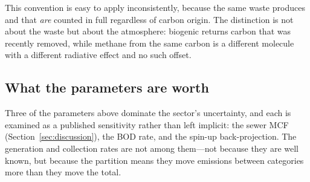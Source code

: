 This convention is easy to apply inconsistently, because the same waste produces \CHfour{} and
\NtwoO{} that \emph{are} counted in full regardless of carbon origin. The distinction is not
about the waste but about the atmosphere: biogenic \COtwo{} returns carbon that was recently
removed, while methane from the same carbon is a different molecule with a different radiative
effect and no such offset.

\subsection{What the parameters are worth}

Three of the parameters above dominate the sector's uncertainty, and each is examined as a
published sensitivity rather than left implicit: the sewer MCF (Section~\ref{sec:discussion}),
the BOD rate, and the spin-up back-projection. The generation and collection rates are not
among them---not because they are well known, but because the partition means they move
emissions between categories more than they move the total.
